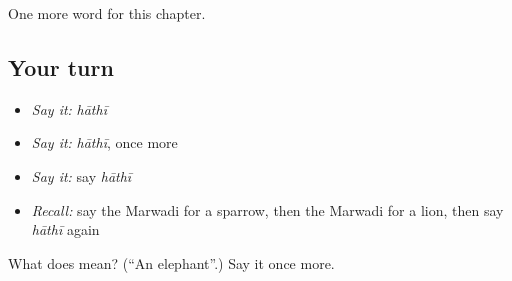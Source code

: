 \begin{grammarlens}[title={What you've built}]
One more word for this chapter.
\end{grammarlens}

\subsection*{Your turn}
\begin{itemize}
\raggedright
  \item \emph{Say it:} \emph{hāthī}
  \item \emph{Say it:} \emph{hāthī}, once more
  \item \emph{Say it:} say \emph{hāthī}
  \item \emph{Recall:} say the Marwadi for a sparrow, then the Marwadi for a lion, then say \emph{hāthī} again
\end{itemize}

\begin{tcolorbox}[breakable,colback=teal!4,colframe=teal!35!black,title={Before you move on}]
What does  mean? (\textquotedblleft{}An elephant\textquotedblright{}.) Say it once more.
\end{tcolorbox}
